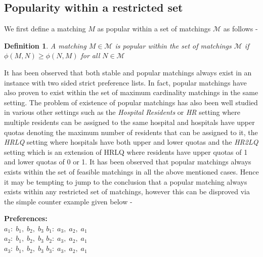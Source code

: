 \documentclass[a4paper,10pt]{article}
\theoremstyle{plain} %
\theoremstyle{plain} %
\newtheorem{definition}{Definition}[section] %
\begin{document}
\subsection{Popularity within a restricted set}
We first define a matching $M$ as popular within a set of matchings $\mathcal{M}$ as follows - 
\begin{definition}
    A matching $M \in \mathcal{M}$ is popular within the set of matchings $\mathcal{M}$ if $\phi(M, N) \geq \phi(N, M)$ for all $N \in \mathcal{M}$
\end{definition}

It has been observed that both stable and popular matchings always exist in an instance with two sided strict preference lists. In fact, popular matchings have also proven to exist within the set of maximum cardinality matchings in the same setting. The problem of existence of popular matchings has also been well studied in various other settings such as the \textit{Hospital Residents} or \textit{HR} setting where multiple residents can be assigned to the same hospital and hospitals have upper quotas denoting the maximum number of residents that can be assigned to it, the \textit{HRLQ} setting \cite{nasre_et_al:LIPIcs:2018:8393} where hospitals have both upper and lower quotas and the \textit{HR2LQ} setting \cite{nasre2021popular} which is an extension of HRLQ where residents have upper quotas of 1 and lower quotas of 0 or 1. It has been observed that popular matchings always exists within the set of feasible matchings in all the above mentioned cases. Hence it may be tempting to jump to the conclusion that a popular matching always exists within any restricted set of matchings, however this can be disproved via the simple counter example given below -
\begin{center}
\textbf{Preferences:} \\
$a_1: \; b_1, \; b_2, \; b_3$ \; \; \; $b_1: \; a_3, \; a_2, \; a_1$ \\
$a_2: \; b_1, \; b_2, \; b_3$ \; \; \; $b_2: \; a_3, \; a_2, \; a_1$ \\
$a_3: \; b_1, \; b_2, \; b_3$ \; \; \; $b_3: \; a_3, \; a_2, \; a_1$ \\
\end{center}
\end{document}
